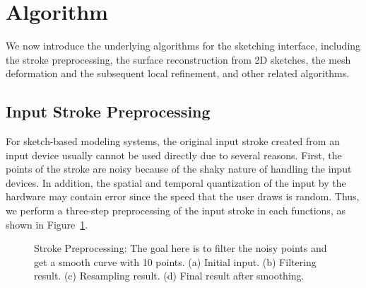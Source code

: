 \section{Algorithm}\label{ch3:sec:alg}

We now introduce the underlying algorithms for the sketching interface, including the stroke preprocessing, the surface reconstruction from 2D sketches, the mesh deformation and the subsequent local refinement, and other related algorithms.

\subsection{Input Stroke Preprocessing}\label{ch3:sec:alg:strokepreproc}

For sketch-based modeling systems, the original input stroke created from an input device usually cannot be used directly due to several reasons. First, the points of the stroke are noisy because of the shaky nature of handling the input devices. In addition, the spatial and temporal quantization of the input by the hardware may contain error since the speed that the user draws is random. Thus, we perform a three-step preprocessing of the input stroke in each functions, as shown in Figure~\ref{fig:alstrokeproc}.

\begin{figure} [htbp]
  \centering
  \caption{Stroke Preprocessing: The goal here is to filter the noisy points and get a smooth curve with 10 points. (a) Initial input. (b) Filtering result. (c) Resampling result. (d) Final result after smoothing.}
  \label{fig:alstrokeproc} %
\end{figure}

